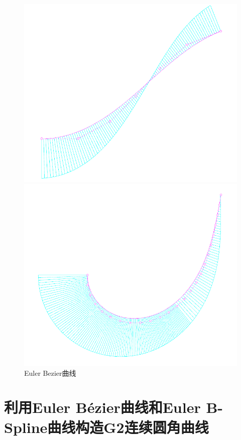 \documentclass[utf8]{ctexart} %
\numberwithin{figure}{section}
\numberwithin{equation}{section}
\begin{document}
		\begin{figure}[htbp]
			\centering
			\begin{minipage}{0.49\linewidth}
				\centering
				\includegraphics[width=0.9\linewidth]{figures/EulerBezierDef1.png}
			\end{minipage}
			\begin{minipage}{0.49\linewidth}
				\centering
				\includegraphics[width=0.9\linewidth]{figures/EulerBezierDef2.png}
			\end{minipage}
			\caption{Euler Bezier曲线}
		\end{figure}
		
		
		\section{利用Euler B\'{e}zier曲线和Euler B-Spline曲线构造G2连续圆角曲线}
\end{document}
